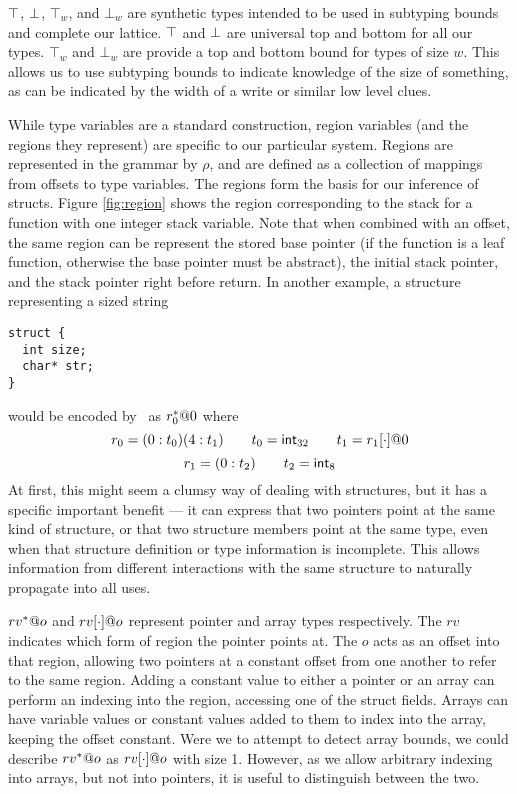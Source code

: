 $\top$, $\bot$, $\top_{w}$, and $\bot_{w}$ are synthetic types intended to be used in subtyping bounds and complete our lattice. $\top$ and $\bot$ are universal top and bottom for all our types. $\top_{w}$ and $\bot_{w}$ are provide a top and bottom bound for types of size $w$. This allows us to use subtyping bounds to indicate knowledge of the size of something, as can be indicated by the width of a write or similar low level clues.

While type variables are a standard construction, region variables (and the regions they represent) are specific to our particular system. Regions are represented in the grammar by $\rho$, and are defined as a collection of mappings from offsets to type variables. The regions form the basis for our inference of structs. Figure \ref{fig:region} shows the region corresponding to the stack for a function with one integer stack variable. Note that when combined with an offset, the same region can be represent the stored base pointer (if the function is a leaf function, otherwise the base pointer must be abstract), the initial stack pointer, and the stack pointer right before return. In another example, a structure representing a sized string
\begin{verbatim}
struct {
  int size;
  char* str;
}
\end{verbatim}
would be encoded by \bitr\ as $r_0^*@0$ where
$$r_0 = (0 : t_0) (4 : t_1) \qquad t_0 = \mathsf{int}_{32} \qquad t_1 = r_1[\cdot]@0$$
$$r_1 = (0 : t_2) \qquad t_2 = \mathsf{int}_{8}$$
At first, this might seem a clumsy way of dealing with structures, but it has a specific important benefit --- it can express that two pointers point at the same kind of structure, or that two structure members point at the same type, even when that structure definition or type information is incomplete. This allows information from different interactions with the same structure to naturally propagate into all uses.

$rv^*@o$ and $rv[\cdot]@o$ represent pointer and array types respectively. The $rv$ indicates which form of region the pointer points at. The $o$ acts as an offset into that region, allowing two pointers at a constant offset from one another to refer to the same region. Adding a constant value to either a pointer or an array can perform an indexing into the region, accessing one of the struct fields. Arrays can have variable values or constant values added to them to index into the array, keeping the offset constant. Were we to attempt to detect array bounds, we could describe $rv^*@o$ as $rv[\cdot]@o$ with size 1. However, as we allow arbitrary indexing into arrays, but not into pointers, it is useful to distinguish between the two.

